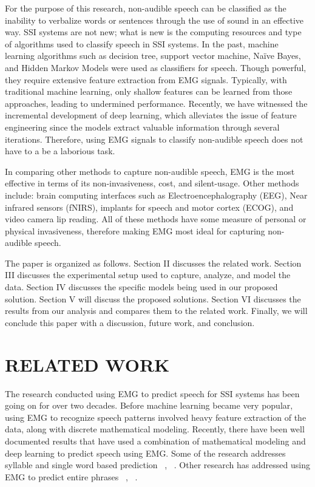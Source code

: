 \documentclass{article}
\begin{document}
For the purpose of this research, non-audible speech can be classified as the inability to verbalize words or sentences through the use of sound in an effective way. SSI systems are not new; what is new is the computing resources and type of algorithms used to classify speech in SSI systems. In the past, machine learning algorithms such as decision tree, support vector machine, Naïve Bayes, and Hidden Markov Models were used as classifiers for speech. Though powerful, they require extensive feature extraction from EMG signals. Typically, with traditional machine learning, only shallow features can be learned from those approaches, leading to undermined performance. Recently, we have witnessed the incremental development of deep learning, which alleviates the issue of feature engineering since the models extract valuable information through several iterations. Therefore, using EMG signals to classify non-audible speech does not have to a be a laborious task.

In comparing other methods to capture non-audible speech, EMG is the most effective in terms of its non-invasiveness, cost, and  silent-usage. Other methods include:  brain computing interfaces such as Electroencephalography (EEG), Near infrared sensors (fNIRS), implants for speech and motor cortex (ECOG), and video camera lip reading. All of these methods have some measure of personal or physical invasiveness, therefore making EMG most ideal for capturing non-audible speech.

The paper is organized as follows. Section II discusses the related work. Section III discusses the experimental setup used to capture, analyze, and model the data. Section IV discusses the specific models being used in our proposed solution. Section V will discuss the proposed solutions. Section VI discusses the results from our analysis and compares them to the related work. Finally, we will conclude this paper with a discussion, future work, and conclusion.

\section{RELATED WORK}
\label{sec:RELATED WORK}

The research conducted using EMG to predict speech for SSI systems has been going on for over two decades. Before machine learning became very popular, using EMG to recognize speech patterns involved heavy feature extraction of the data, along with discrete mathematical modeling. Recently, there have been well documented results that have used a combination of mathematical modeling and deep learning to predict speech using EMG. Some of the research addresses syllable and single word based prediction ~\cite{lopez-larraz_syllable-based_2010}, ~\cite{maier-hein_session_2005}. Other research has addressed using EMG to predict entire phrases ~\cite{janke_emg--speech:_2017}, ~\cite{kapur_alterego:_2018}.
\end{document}
